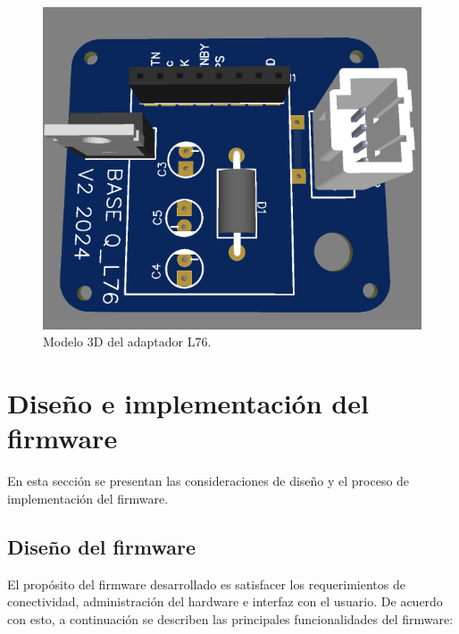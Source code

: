 \begin{figure}[htbp]
	\centering
	\includegraphics[width=.5\textwidth]{./Figures/QL76_modelo_3d_sup.png}
	\caption{Modelo 3D del adaptador L76.}
	\label{fig:adap_L76_3d}
\end{figure}



\section{Diseño e implementación del firmware}

En esta sección se presentan las consideraciones de diseño y el proceso de implementación del firmware. 

\subsection{Diseño del firmware}

El propósito del firmware desarrollado es satisfacer los requerimientos de conectividad, administración del hardware e interfaz con el usuario. De acuerdo con esto, a continuación se describen las principales funcionalidades del firmware: 

